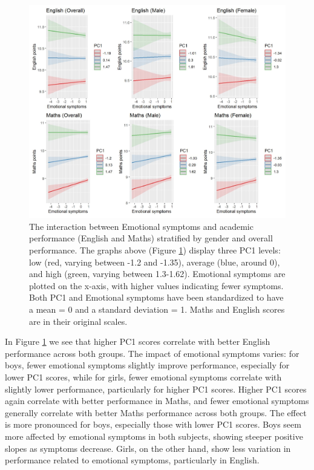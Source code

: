 \documentclass[12pt,a4paper,onecolumn]{article}
\numberwithin{equation}{section}
\begin{document}
\begin{figure}[ht] 
    \centering
    \includegraphics[width=1\linewidth]{AVE_SDQ_Emot.JPG}
    \caption{The interaction between Emotional symptoms and academic performance (English and Maths) stratified by gender and overall performance. The graphs above (Figure \ref{Fig2}) display three PC1 levels: low (red, varying between -1.2 and -1.35), average (blue, around 0), and high (green, varying between 1.3-1.62). Emotional symptoms are plotted on the x-axis, with higher values indicating fewer symptoms. Both PC1 and Emotional symptoms have been standardized to have a mean = 0 and a standard deviation = 1. Maths and English scores are in their original scales.}
    \label{Fig2}
\end{figure}

 In Figure \ref{Fig2} we see that higher PC1 scores correlate with better English performance across both groups. The impact of emotional symptoms varies: for boys, fewer emotional symptoms slightly improve performance, especially for lower PC1 scores, while for girls, fewer emotional symptoms correlate with slightly lower performance, particularly for higher PC1 scores. Higher PC1 scores again correlate with better performance in Maths, and fewer emotional symptoms generally correlate with better Maths performance across both groups. The effect is more pronounced for boys, especially those with lower PC1 scores. Boys seem more affected by emotional symptoms in both subjects, showing steeper positive slopes as symptoms decrease.
Girls, on the other hand, show less variation in performance related to emotional symptoms, particularly in English.
\end{document}
